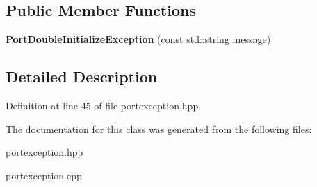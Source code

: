\subsection*{Public Member Functions}
\begin{DoxyCompactItemize}
\item 
\hypertarget{class_port_double_initialize_exception_a0c867de39d44cfa990a7b2ec9be0f09f}{}\label{class_port_double_initialize_exception_a0c867de39d44cfa990a7b2ec9be0f09f} 
{\bfseries Port\+Double\+Initialize\+Exception} (const std\+::string message)
\end{DoxyCompactItemize}


\subsection{Detailed Description}


Definition at line 45 of file portexception.\+hpp.



The documentation for this class was generated from the following files\+:\begin{DoxyCompactItemize}
\item 
portexception.\+hpp\item 
portexception.\+cpp\end{DoxyCompactItemize}

